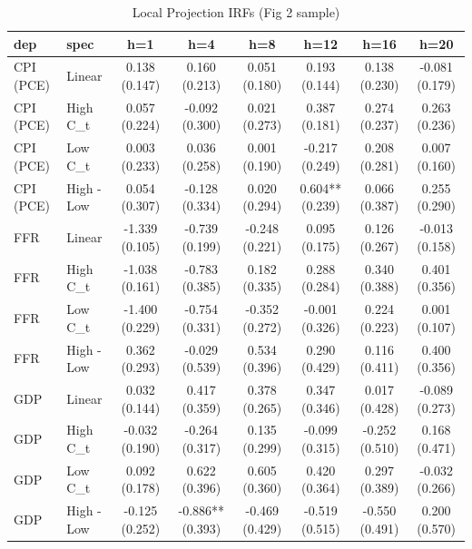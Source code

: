 \begin{table}

\caption{\label{tab:tab:lp_main}Local Projection IRFs (Fig 2 sample)}
\centering
\begin{tabular}[t]{llcccccc}
\toprule
dep & spec & h=1 & h=4 & h=8 & h=12 & h=16 & h=20\\
\midrule
CPI (PCE) & Linear & 0.138
(0.147) & 0.160
(0.213) & 0.051
(0.180) & 0.193
(0.144) & 0.138
(0.230) & -0.081
(0.179)\\
CPI (PCE) & High C_t & 0.057
(0.224) & -0.092
(0.300) & 0.021
(0.273) & 0.387
(0.181) & 0.274
(0.237) & 0.263
(0.236)\\
CPI (PCE) & Low C_t & 0.003
(0.233) & 0.036
(0.258) & 0.001
(0.190) & -0.217
(0.249) & 0.208
(0.281) & 0.007
(0.160)\\
CPI (PCE) & High - Low & 0.054
(0.307) & -0.128
(0.334) & 0.020
(0.294) & 0.604**
(0.239) & 0.066
(0.387) & 0.255
(0.290)\\
FFR & Linear & -1.339
(0.105) & -0.739
(0.199) & -0.248
(0.221) & 0.095
(0.175) & 0.126
(0.267) & -0.013
(0.158)\\
\addlinespace
FFR & High C_t & -1.038
(0.161) & -0.783
(0.385) & 0.182
(0.335) & 0.288
(0.284) & 0.340
(0.388) & 0.401
(0.356)\\
FFR & Low C_t & -1.400
(0.229) & -0.754
(0.331) & -0.352
(0.272) & -0.001
(0.326) & 0.224
(0.223) & 0.001
(0.107)\\
FFR & High - Low & 0.362
(0.293) & -0.029
(0.539) & 0.534
(0.396) & 0.290
(0.429) & 0.116
(0.411) & 0.400
(0.356)\\
GDP & Linear & 0.032
(0.144) & 0.417
(0.359) & 0.378
(0.265) & 0.347
(0.346) & 0.017
(0.428) & -0.089
(0.273)\\
GDP & High C_t & -0.032
(0.190) & -0.264
(0.317) & 0.135
(0.299) & -0.099
(0.315) & -0.252
(0.510) & 0.168
(0.471)\\
\addlinespace
GDP & Low C_t & 0.092
(0.178) & 0.622
(0.396) & 0.605
(0.360) & 0.420
(0.364) & 0.297
(0.389) & -0.032
(0.266)\\
GDP & High - Low & -0.125
(0.252) & -0.886**
(0.393) & -0.469
(0.429) & -0.519
(0.515) & -0.550
(0.491) & 0.200
(0.570)\\
\bottomrule
\end{tabular}
\end{table}